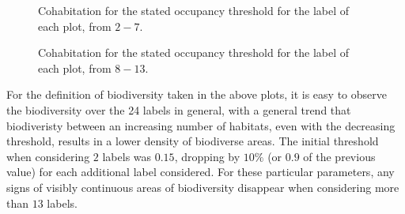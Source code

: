 \begin{figure}
    \caption{Cohabitation for the stated occupancy threshold for the label of each plot, from $2-7$.}
\end{figure}

\begin{figure}
    \caption{Cohabitation for the stated occupancy threshold for the label of each plot, from $8-13$.}
\end{figure}

For the definition of biodiversity taken in the above plots, it is easy to observe the biodiversity over the 24 labels in general, with a general trend that biodiveristy between an increasing number of habitats, even with the decreasing threshold, results in a lower density of biodiverse areas. The initial threshold when considering $2$ labels was $0.15$, dropping by $10\%$ (or $0.9$ of the previous value) for each additional label considered. For these particular parameters, any signs of visibly continuous areas of biodiversity disappear when considering more than $13$ labels.

